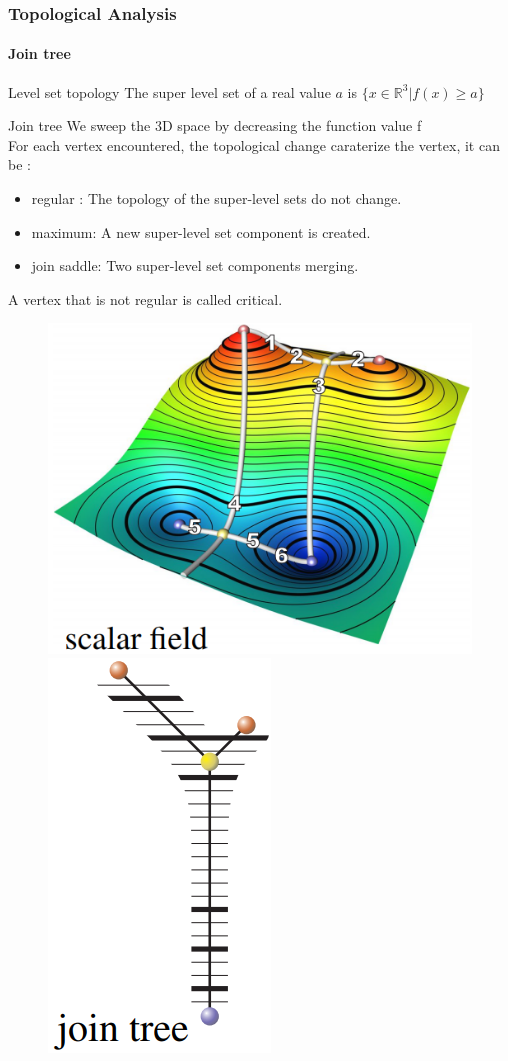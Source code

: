 \documentclass[9pt]{beamer}
\begin{document}
\begin{frame}
\frametitle{Topological Analysis}
\framesubtitle{Join tree}
\begin{block}{Level set topology}
The super level set of a real value $a$ is $\{x\in \mathbb{R}^3 | f(x)\geq a\}$
\end{block}
\begin{block}{Join tree}
We sweep the 3D space by decreasing the function value f\\
For each vertex encountered, the topological change caraterize the vertex, it can be :
\begin{itemize}
\item regular : The topology of the super-level sets do not change.
\item maximum: A new super-level set component is created.
\item join saddle: Two super-level set components merging.
\end{itemize}
A vertex that is not regular is called critical.
\end{block}
\begin{figure}
\centering
\begin{minipage}{.5\textwidth}
  \centering
  \includegraphics[width=0.4\linewidth]{Images/scalar_field}
\end{minipage}%
\begin{minipage}{.5\textwidth}
  \centering
  \includegraphics[scale=0.15]{Images/join_tree_of_scalar_field}
\end{minipage}
\end{figure}
\end{frame}
\end{document}
